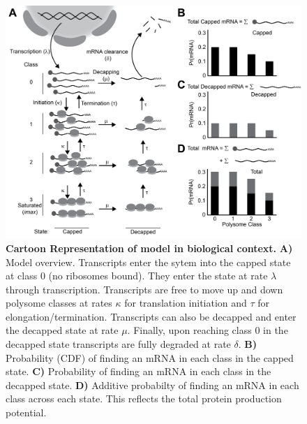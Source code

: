 \documentclass[10pt,letterpaper]{article}
\begin{document}
\begin{figure}[!h]
  \begin{center}
    \includegraphics[width=120mm]{Images/Figure1_biomodel_V3.png}
    \caption{{\bf Cartoon Representation of model in biological context.} 
      {\bf A)} Model overview.
      Transcripts enter the sytem into the capped state at class 0 (no ribosomes bound).
      They enter the state at rate $\lambda$ through transcription.
      Transcripts are free to move up and down polysome classes at rates $\kappa$ for translation initiation and $\tau$ for elongation/termination.
      Transcripts can also be decapped and enter the decapped state at rate $\mu$.
      Finally, upon reaching class 0 in the decapped state transcripts are fully degraded at rate $\delta$. {\bf B)} Probability (CDF) of finding an mRNA in each class in the capped state. {\bf C)} Probability of finding an mRNA in each class in the decapped state. {\bf D)} Additive probabilty of finding an mRNA in each class across each state.
      This reflects the total protein production potential.}
    \label{fig1}
  \end{center}
\end{figure}
\end{document}
